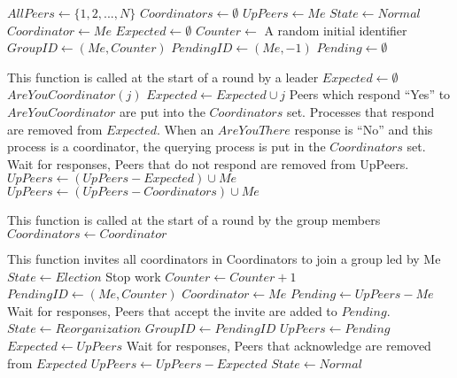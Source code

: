 \begin{flushleft}
\begin{algorithmic}[1]

\State $AllPeers \gets \{ 1, 2, ..., N \}$
\State $Coordinators \gets \emptyset$
\State $UpPeers \gets { Me }$
\State $State \gets Normal$
\State $Coordinator \gets Me$
\State $Expected \gets \emptyset$
\State $Counter \gets$ A random initial identifier
\State $GroupID \gets (Me,Counter)$
\State $PendingID \gets (Me, -1)$
\State $Pending \gets \emptyset$

\State

    \State This function is called at the start of a round by a leader
        \Return
    \EndIf
    \State $Expected \gets \emptyset$
        \State $AreYouCoordinator(j)$
        \State $Expected \gets Expected \cup j$
    \EndFor
    \State Peers which respond ``Yes'' to $AreYouCoordinator$ are put into the $Coordinators$ set.
    \State Processes that respond are removed from $Expected$.
    \State When an $AreYouThere$ response is ``No'' and this process is a coordinator, the querying process is put in the $Coordinators$ set.
    \State Wait for responses, Peers that do not respond are removed from UpPeers.
    \State $UpPeers \gets (UpPeers-Expected) \cup {Me}$
    \State $UpPeers \gets (UpPeers-Coordinators) \cup {Me}$
        \Return
    \EndIf
        \State
    \EndIf
\EndFunction

\State

    \State This function is called at the start of a round by the group members
        \Return
    \Else
			\State $Coordinators \gets Coordinator$
        \EndIf
    \EndIf
\EndFunction

\State

    \State This function invites all coordinators in Coordinators to join a group led by Me
    \State $State \gets Election$
    \State Stop work
    \State $Counter \gets Counter+1$
    \State $PendingID \gets (Me,Counter)$
    \State $Coordinator \gets Me$
    \State $Pending \gets UpPeers - {Me}$
    \EndFor
    \State Wait for responses, Peers that accept the invite are added to $Pending$.
    \State $State \gets Reorganization$
	\State $GroupID \gets PendingID$
	\State $UpPeers \gets Pending$
    \EndFor
    \State $Expected \gets UpPeers$
    \State Wait for responses, Peers that acknowledge are removed from $Expected$
    \State $UpPeers \gets UpPeers - Expected$
    \State $State \gets Normal$
\EndFunction


\end{algorithmic}
\end{flushleft}
